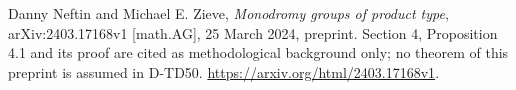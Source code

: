 Danny Neftin and Michael E. Zieve,
\emph{Monodromy groups of product type},
arXiv:2403.17168v1 [math.AG], 25 March 2024, preprint.
Section 4, Proposition 4.1 and its proof are cited as methodological
background only; no theorem of this preprint is assumed in D-TD50.
\url{https://arxiv.org/html/2403.17168v1}.

